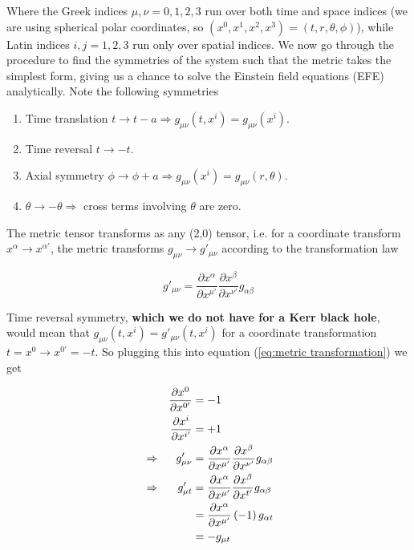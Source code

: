 Where the Greek indices $\mu, \nu = 0,1,2,3$ run over both time and space indices (we are using spherical polar coordinates, so $(x^0,x^1,x^2,x^3)=(t,r,\theta,\phi)$), while Latin indices $i, j = 1,2,3$ run only over spatial indices. We now go through the procedure to find the symmetries of the system such that the metric takes the simplest form, giving us a chance to solve the Einstein field equations (EFE) analytically. Note the following symmetries




\begin{enumerate}
    \item Time translation $t \rightarrow t-a\Rightarrow g_{\mu \nu}(t,x^i)=g_{\mu \nu}(x^i)$.
    
    \item {} Time reversal $t \rightarrow -t$.
    
    \item Axial symmetry $\phi \rightarrow \phi + a\Rightarrow g_{\mu \nu}(x^i)=g_{\mu \nu} (r, \theta)$.

    \item $\theta \rightarrow -\theta \Rightarrow$ cross terms involving $\theta$ are zero.
\end{enumerate}

The metric tensor transforms as any (2,0) tensor, i.e. for a coordinate transform $x^{\alpha} \rightarrow x^{\alpha'}$, the metric transforms $g_{\mu \nu} \rightarrow g'_{\mu \nu}$ according to the transformation law

\begin{equation}
    g'_{\mu \nu} = \frac{\partial x^{\alpha}}{\partial x^{\mu'}} \frac{\partial x^{\beta}}{\partial x^{\nu'}} g_{\alpha \beta}
\label{eq:metric transformation}
\end{equation}


Time reversal symmetry, \textbf{which we do not have for a Kerr black hole}, would mean that $g_{\mu \nu}(t, x^i) = g'_{\mu \nu}(t, x^i)$ for a coordinate transformation $t=x^0 \rightarrow x^{0'}=-t$. So plugging this into equation (\ref{eq:metric transformation}) we get 

\begin{alignat}{2}
    &&\frac{\partial x^0}{\partial x^{0'}} &= -1 \notag \\
    &&\frac{\partial x^i}{\partial x^{i'}} &= +1 \notag \\
    &\Rightarrow
    &g'_{\mu \nu} &= \frac{\partial x^{\alpha}}{\partial x^{\mu'}} \frac{\partial x^{\beta}}{\partial x^{\nu'}} g_{\alpha \beta}\notag \\
    &\Rightarrow
    &g'_{\mu t} &= \frac{\partial x^{\alpha}}{\partial x^{\mu'}} \frac{\partial x^{\beta}}{\partial x^{t'}} g_{\alpha \beta}\notag \\
    &&&=\frac{\partial x^{\alpha}}{\partial x^{\mu'}} \left( -1 \right) g_{\alpha t}\notag \\
    &&&=-g_{\mu t}
\end{alignat}

